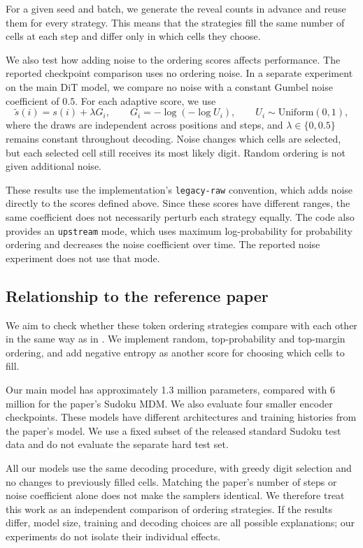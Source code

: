 \documentclass{article}
\begin{document}
For a given seed and batch, we generate the reveal counts in advance and
reuse them for every strategy. This means that the strategies fill the same
number of cells at each step and differ only in which cells they choose.

We also test how adding noise to the ordering scores affects performance.
The reported checkpoint comparison uses no ordering noise. In a separate
experiment on the main DiT model, we compare no noise with a constant
Gumbel noise coefficient of $0.5$. For each adaptive score, we use
\[
    \widetilde{s}(i)=s(i)+\lambda G_i,
    \qquad G_i=-\log(-\log U_i),
    \qquad U_i\sim\mathrm{Uniform}(0,1),
\]
where the draws are independent across positions and steps, and
$\lambda\in\{0,0.5\}$ remains constant throughout decoding. Noise changes
which cells are selected, but each selected cell still receives its most
likely digit. Random ordering is not given additional noise.

These results use the implementation's \texttt{legacy-raw} convention,
which adds noise directly to the scores defined above. Since these scores
have different ranges, the same coefficient does not necessarily perturb
each strategy equally. The code also provides an \texttt{upstream} mode,
which uses maximum log-probability for probability ordering and decreases
the noise coefficient over time. The reported noise experiment does not
use that mode.

\subsection{Relationship to the reference paper}
We aim to check whether these token ordering strategies compare with each
other in the same way as in \citet{kim2025trainworstplanbest}. We implement
random, top-probability and top-margin ordering, and add negative entropy
as another score for choosing which cells to fill.

Our main model has approximately 1.3 million parameters, compared with
6 million for the paper's Sudoku MDM. We also evaluate four smaller encoder
checkpoints. These models have different architectures and training
histories from the paper's model. We use a fixed subset of the released
standard Sudoku test data and do not evaluate the separate hard test set.

All our models use the same decoding procedure, with greedy digit selection
and no changes to previously filled cells. Matching the paper's number of
steps or noise coefficient alone does not make the samplers identical.
We therefore treat this work as an independent comparison of ordering
strategies. If the results differ, model size, training and decoding choices
are all possible explanations; our experiments do not isolate their
individual effects.
\end{document}
